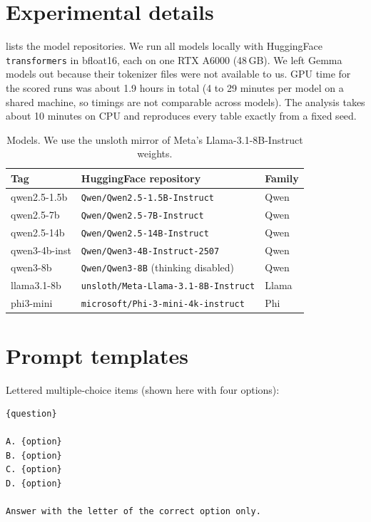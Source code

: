 \section{Experimental details}
\label{app:setup}

 lists the model repositories.
We run all models locally with HuggingFace \texttt{transformers} in bfloat16, each on one RTX A6000 (48\,GB).
We left Gemma models out because their tokenizer files were not available to us.
GPU time for the scored runs was about 1.9 hours in total (4 to 29 minutes per model on a shared machine, so timings are not comparable across models).
The analysis takes about 10 minutes on CPU and reproduces every table exactly from a fixed seed.

\begin{table}[h]
    \centering
    \caption{Models. We use the unsloth mirror of Meta's Llama-3.1-8B-Instruct weights.}
    \label{tab:models}
    \small
    \begin{tabular}{@{}lll@{}}
        \toprule
        \textbf{Tag} & \textbf{HuggingFace repository} & \textbf{Family} \\
        \midrule
        qwen2.5-1.5b  & \texttt{Qwen/Qwen2.5-1.5B-Instruct} & Qwen \\
        qwen2.5-7b    & \texttt{Qwen/Qwen2.5-7B-Instruct} & Qwen \\
        qwen2.5-14b   & \texttt{Qwen/Qwen2.5-14B-Instruct} & Qwen \\
        qwen3-4b-inst & \texttt{Qwen/Qwen3-4B-Instruct-2507} & Qwen \\
        qwen3-8b      & \texttt{Qwen/Qwen3-8B} (thinking disabled) & Qwen \\
        llama3.1-8b   & \texttt{unsloth/Meta-Llama-3.1-8B-Instruct} & Llama \\
        phi3-mini     & \texttt{microsoft/Phi-3-mini-4k-instruct} & Phi \\
        \bottomrule
    \end{tabular}
\end{table}

\section{Prompt templates}
\label{app:prompts}

Lettered multiple-choice items (shown here with four options):

\begin{lstlisting}
{question}

A. {option}
B. {option}
C. {option}
D. {option}

Answer with the letter of the correct option only.
\end{lstlisting}

